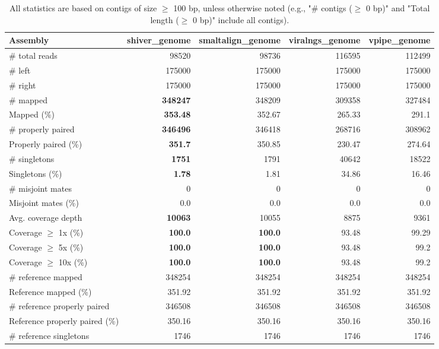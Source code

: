 \documentclass[12pt,a4paper]{article}
\begin{document}
\begin{table}[ht]
\begin{center}
\caption{All statistics are based on contigs of size $\geq$ 100 bp, unless otherwise noted (e.g., "\# contigs ($\geq$ 0 bp)" and "Total length ($\geq$ 0 bp)" include all contigs).}
\begin{tabular}{|l*{4}{|r}|}
\hline
Assembly & shiver\_genome & smaltalign\_genome & viralngs\_genome & vpipe\_genome \\ \hline
\# total reads & 98520 & 98736 & 116595 & 112499 \\ \hline
\# left & 175000 & 175000 & 175000 & 175000 \\ \hline
\# right & 175000 & 175000 & 175000 & 175000 \\ \hline
\# mapped & {\bf 348247} & 348209 & 309358 & 327484 \\ \hline
Mapped (\%) & {\bf 353.48} & 352.67 & 265.33 & 291.1 \\ \hline
\# properly paired & {\bf 346496} & 346418 & 268716 & 308962 \\ \hline
Properly paired (\%) & {\bf 351.7} & 350.85 & 230.47 & 274.64 \\ \hline
\# singletons & {\bf 1751} & 1791 & 40642 & 18522 \\ \hline
Singletons (\%) & {\bf 1.78} & 1.81 & 34.86 & 16.46 \\ \hline
\# misjoint mates & 0 & 0 & 0 & 0 \\ \hline
Misjoint mates (\%) & 0.0 & 0.0 & 0.0 & 0.0 \\ \hline
Avg. coverage depth & {\bf 10063} & 10055 & 8875 & 9361 \\ \hline
Coverage $\geq$ 1x (\%) & {\bf 100.0} & {\bf 100.0} & 93.48 & 99.29 \\ \hline
Coverage $\geq$ 5x (\%) & {\bf 100.0} & {\bf 100.0} & 93.48 & 99.2 \\ \hline
Coverage $\geq$ 10x (\%) & {\bf 100.0} & {\bf 100.0} & 93.48 & 99.2 \\ \hline
\# reference mapped & 348254 & 348254 & 348254 & 348254 \\ \hline
Reference mapped (\%) & 351.92 & 351.92 & 351.92 & 351.92 \\ \hline
\# reference properly paired & 346508 & 346508 & 346508 & 346508 \\ \hline
Reference properly paired (\%) & 350.16 & 350.16 & 350.16 & 350.16 \\ \hline
\# reference singletons & 1746 & 1746 & 1746 & 1746 \\ \hline

\end{tabular}
\end{center}
\end{table}
\end{document}
